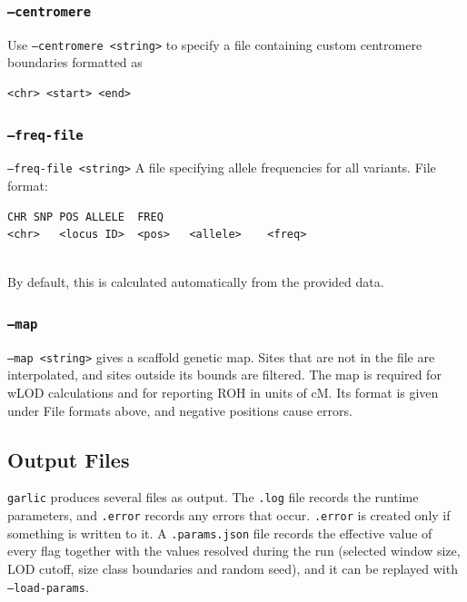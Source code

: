 \documentclass[12pt]{article}%
\begin{document}
\subsubsection{{\tt --centromere}}

Use {\tt --centromere <string>} to specify a file containing custom centromere boundaries formatted as
\begin{lstlisting}
<chr> <start> <end>
\end{lstlisting}

\subsubsection{{\tt --freq-file}}

{\tt --freq-file <string>} A file specifying allele frequencies for all variants. File format:
\begin{lstlisting}
CHR	SNP	POS	ALLELE	FREQ 
<chr>	<locus ID>	<pos>	<allele>	<freq>
\end{lstlisting}
~\\
\noindent By default, this is calculated automatically from the provided data.

\subsubsection{{\tt --map}}

{\tt --map <string>} gives a scaffold genetic map.  Sites that are not in the file are interpolated, and sites outside its bounds are filtered.  The map is required for wLOD calculations and for reporting ROH in units of cM.  Its format is given under File formats above, and negative positions cause errors.

\subsection{Output Files}

{\tt garlic} produces several files as output.  The {\tt .log} file records
the runtime parameters, and {\tt .error} records any errors that occur.
{\tt .error} is created only if something is written to it.  A
{\tt .params.json} file records the effective value of every flag together
with the values resolved during the run (selected window size, LOD cutoff, size
class boundaries and random seed), and it can be replayed with
{\tt --load-params}.
\end{document}
